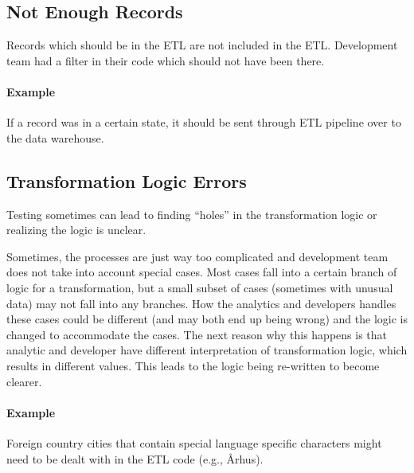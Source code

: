 \subsection*{Not Enough Records}

Records which should be in the ETL are not included in the ETL.
Development team had a filter in their code which should not have been there.

\paragraph*{Example} If a record was in a certain state, it should be sent through ETL pipeline over to the data warehouse.


\subsection*{Transformation Logic Errors}

Testing sometimes can lead to finding \enquote{holes} in the transformation logic or realizing the logic is unclear.

Sometimes, the processes are just way too complicated and development team does not take into account special cases.
Most cases fall into a certain branch of logic for a transformation, but a small subset of cases (sometimes with unusual data) may not fall into any branches.
How the analytics and developers handles these cases could be different (and may both end up being wrong) and the logic is changed to accommodate the cases.
The next reason why this happens is that analytic and developer have different interpretation of transformation logic, which results in different values.
This leads to the logic being re-written to become clearer.

\paragraph*{Example} Foreign country cities that contain special language specific characters might need to be dealt with in the ETL code (e.g., Århus).



